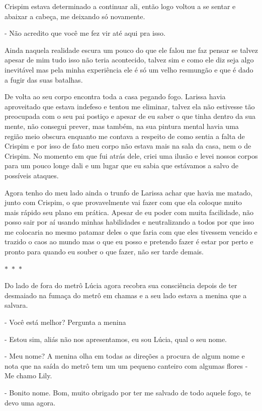 Crispim estava determinado a continuar ali, então logo voltou a se sentar e abaixar a cabeça, me deixando só novamente. 

- Não acredito que você me fez vir até aqui pra isso.

Ainda naquela realidade escura um pouco do que ele falou me faz pensar se talvez apesar de mim tudo isso não teria acontecido, talvez sim e como ele diz seja algo inevitável mas pela minha experiência ele é só um velho resmungão e que é dado a fugir das suas batalhas.

De volta ao seu corpo encontra toda a casa pegando fogo. Larissa havia aproveitado que estava indefeso e tentou me eliminar, talvez ela não estivesse tão preocupada com o seu pai postiço e apesar de eu saber o que tinha dentro da sua mente, não consegui prever, mas também, na sua pintura mental havia uma região meio obscura enquanto me contava a respeito de como sentia a falta de Crispim e por isso de fato meu corpo não estava mais na sala da casa, nem o de Crispim. No momento em que fui atrás dele, criei uma ilusão e levei nossos corpos para um pouco longe dali e um lugar que eu sabia que estávamos a salvo de possíveis ataques.

Agora tenho do meu lado ainda o trunfo de Larissa achar que havia me matado, junto com Crispim, o que provavelmente vai fazer com que ela coloque muito mais rápido seu plano em prática. Apesar de eu poder com muita facilidade, não posso sair por aí usando minhas habilidades e neutralizando a todos por que isso me colocaria no mesmo patamar deles o que faria com que eles tivessem vencido e trazido o caos ao mundo mas o que eu posso e pretendo fazer é estar por perto e pronto para quando eu souber o que fazer, não ser tarde demais.

\begin{center}
	$\ast$~$\ast$~$\ast$
\end{center}

Do lado de fora do metrô Lúcia agora recobra sua consciência depois de ter desmaiado na fumaça do metrô em chamas e a seu lado estava a menina que a salvara.

- Você está melhor? Pergunta a menina

- Estou sim, aliás não nos apresentamos, eu sou Lúcia, qual o seu nome.

- Meu nome? A menina olha em todas as direções a procura de algum nome e nota que na saída do metrô tem um um pequeno canteiro com algumas flores - Me chamo Lily.

- Bonito nome. Bom, muito obrigado por ter me salvado de todo aquele fogo, te devo uma agora.

